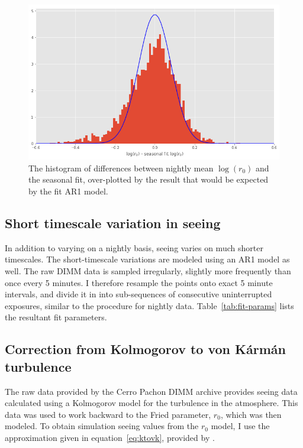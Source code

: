 \documentclass[\docopts]{\docclass}
\begin{document}
\begin{figure}
  \includegraphics[width=\columnwidth]{night_ar1_dist.png}
  \caption{The histogram of differences between nightly mean
    $\log(r_0)$ and the seasonal fit, over-plotted by the result that
    would be expected by the fit AR1 model.}
  \label{fig:night-ar1-dist}
\end{figure}

\subsection{Short timescale variation in seeing}
\label{sec:short-variation}

In addition to varying on a nightly basis, seeing varies on much
shorter timescales. The short-timescale variations are modeled using
an AR1 model as well. The raw DIMM data is sampled irregularly,
slightly more frequently than once every 5 minutes. I therefore
resample the points onto exact 5 minute intervals, and divide it in into
sub-sequences of consecutive uninterrupted exposures, similar to the
procedure for nightly data. Table~\ref{tab:fit-params} lists the
resultant fit parameters.

\subsection{Correction from Kolmogorov to von K\'arm\'an turbulence}
\label{sec:vkcorr}

The raw data provided by the Cerro Pachon DIMM archive provides seeing
data calculated using a Kolmogorov model for the turbulence in the
atmosphere. This data was used to work backward to the Fried
parameter, $r_0$, which was then modeled. To obtain simulation seeing
values from the $r_0$ model, I use the approximation given in
equation~\ref{eq:ktovk}, provided by \cite{2002PASP..114.1156T}.
\end{document}
